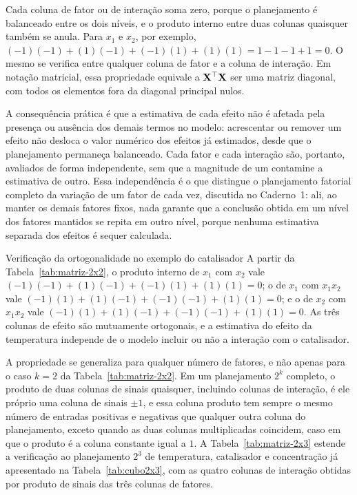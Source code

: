 \documentclass{doeapostila}
\begin{document}
Cada coluna de fator ou de interação soma zero, porque o planejamento é
balanceado entre os dois níveis, e o produto interno entre duas colunas
quaisquer também se anula. Para $x_{1}$ e $x_{2}$, por exemplo,
$(-1)(-1) + (1)(-1) + (-1)(1) + (1)(1) = 1 - 1 - 1 + 1 = 0$. O mesmo se
verifica entre qualquer coluna de fator e a coluna de interação. Em notação
matricial, essa propriedade equivale a $\mathbf{X}^{\top}\mathbf{X}$ ser uma matriz
diagonal, com todos os elementos fora da diagonal principal nulos.

A consequência prática é que a estimativa de cada efeito não é afetada pela
presença ou ausência dos demais termos no modelo: acrescentar ou remover um
efeito não desloca o valor numérico dos efeitos já estimados, desde que o
planejamento permaneça balanceado. Cada fator e cada interação são, portanto,
avaliados de forma independente, sem que a magnitude de um contamine a
estimativa de outro. Essa independência é o que distingue o planejamento
fatorial completo da variação de um fator de cada vez, discutida no
Caderno~1: ali, ao manter os demais fatores fixos, nada garante que a
conclusão obtida em um nível dos fatores mantidos se repita em outro nível,
porque nenhuma estimativa separada dos efeitos é sequer calculada.

\begin{aplicacao}{Verificação da ortogonalidade no exemplo do catalisador}
  A partir da Tabela~\ref{tab:matriz-2x2}, o produto interno de $x_{1}$ com
  $x_{2}$ vale $(-1)(-1)+(1)(-1)+(-1)(1)+(1)(1) = 0$; o de $x_{1}$ com
  $x_{1}x_{2}$ vale $(-1)(1)+(1)(-1)+(-1)(-1)+(1)(1) = 0$; e o de $x_{2}$ com
  $x_{1}x_{2}$ vale $(-1)(1)+(1)(-1)+(-1)(-1)+(1)(1) = 0$. As três colunas de
  efeito são mutuamente ortogonais, e a estimativa do efeito da temperatura
  independe de o modelo incluir ou não a interação com o catalisador.
\end{aplicacao}

A propriedade se generaliza para qualquer número de fatores, e não apenas
para o caso $k = 2$ da Tabela~\ref{tab:matriz-2x2}. Em um planejamento
$2^{k}$ completo, o produto de duas colunas de sinais quaisquer, incluindo
colunas de interação, é ele próprio uma coluna de sinais $\pm 1$, e essa
coluna produto tem sempre o mesmo número de entradas positivas e negativas
que qualquer outra coluna do planejamento, exceto quando as duas colunas
multiplicadas coincidem, caso em que o produto é a coluna constante igual a
$1$. A Tabela~\ref{tab:matriz-2x3} estende a verificação ao planejamento
$2^{3}$ de temperatura, catalisador e concentração já apresentado na
Tabela~\ref{tab:cubo2x3}, com as quatro colunas de interação obtidas por
produto de sinais das três colunas de fatores.
\end{document}
